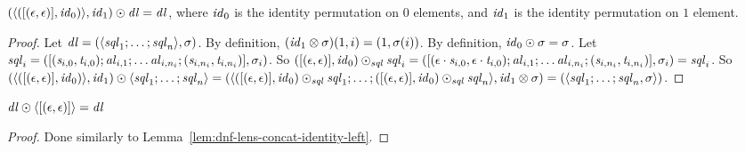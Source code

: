 \documentclass[numbers,10pt,preprint\ifanon ,nocopyrightspace\fi]{sigplanconf}
\begin{document}
\begin{lemma}
  \label{lem:dnf-lens-concat-identity-left}
  $(\langle([(\epsilon,\epsilon)],\mathit{id}_0)\rangle,\mathit{id}_1)
  \odot
  \mathit{dl} = \mathit{dl}$,
  where $\mathit{id}_0$ is the identity permutation on $0$ elements, and
  $\mathit{id}_1$ is the identity permutation on $1$ element.
\end{lemma}
\begin{proof}
  Let $\mathit{dl} = (\langle\mathit{sql}_1;\ldots;\mathit{sql}_n\rangle,\sigma)$.
  By definition, $(\mathit{id}_1 \otimes \sigma)(1,i) = (1,\sigma(i))$.
  By definition, $\mathit{id}_0 \odot \sigma = \sigma$.
  Let $\mathit{sql}_i =
  ([(\mathit{s}_{i,0},\mathit{t}_{i,0});\mathit{al}_{i,1};\ldots
    \mathit{al}_{i,n_i};(\mathit{s}_{i,n_i},\mathit{t}_{i,n_i})],\sigma_i)$.
  So $([(\epsilon,\epsilon)],\mathit{id}_0)
  \odot_{\mathit{sql}}\mathit{sql}_i =
  ([(\epsilon\cdot\mathit{s}_{i,0},\epsilon\cdot\mathit{t}_{i,0});\mathit{al}_{i,1};\ldots
    \mathit{al}_{i,n_i};(\mathit{s}_{i,n_i},\mathit{t}_{i,n_i})],\sigma_i) =
  \mathit{sql}_i$.
  So
  $(\langle([(\epsilon,\epsilon)],\mathit{id}_0)\rangle,\mathit{id}_1)
  \odot \langle\mathit{sql}_1;\ldots;\mathit{sql}_n\rangle =
  (\langle([(\epsilon,\epsilon)],\mathit{id}_0)
    \odot_{\mathit{sql}} \mathit{sql}_1; \ldots ;
    ([(\epsilon,\epsilon)],\mathit{id}_0) \odot_{\mathit{sql}}
    \mathit{sql}_n\rangle,\mathit{id}_1 \otimes \sigma) =
  (\langle\mathit{sql}_1;\ldots;\mathit{sql}_n,\sigma\rangle)$.
\end{proof}

\begin{lemma}
  \label{lem:dnf-lens-concat-identity-right}
  $\mathit{dl} \odot
  \langle[(\epsilon,\epsilon)]\rangle = \mathit{dl}$
\end{lemma}
\begin{proof}
Done similarly to Lemma~\ref{lem:dnf-lens-concat-identity-left}.
\end{proof}
\end{document}
